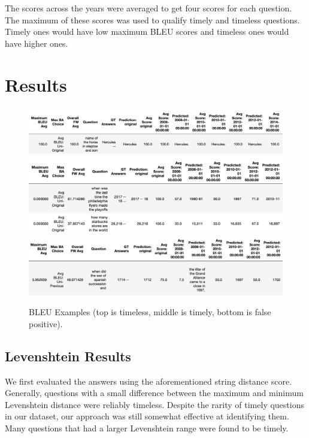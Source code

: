 \documentclass{article}
\begin{document}
The scores across the years were averaged to get four scores for each question. The maximum of these scores was used to qualify timely and timeless questions. Timely ones would have low maximum BLEU scores and timeless ones would have higher ones.

\section{Results}
\label{results}
\begin{figure}[ht]
    \begin{center}
        \includegraphics[width=5in]{timeless bleu.png}
        \includegraphics[width=5in]{timely bleu.png}
        \includegraphics[width=5in]{bleu false pos.png}
	\end{center}  
  \caption{BLEU Examples (top is timeless, middle is timely, bottom is false positive).}
  \label{fig:bleu_examples}
\end{figure}

\subsection{Levenshtein Results}
\label{fuzzy results}

We first evaluated the answers using the aforementioned string distance score. Generally, questions with a small difference between the maximum and minimum Levenshtein distance were reliably timeless. Despite the rarity of timely questions in our dataset, our approach was still somewhat effective at identifying them. Many questions that had a larger Levenshtein range were found to be timely.
\end{document}
